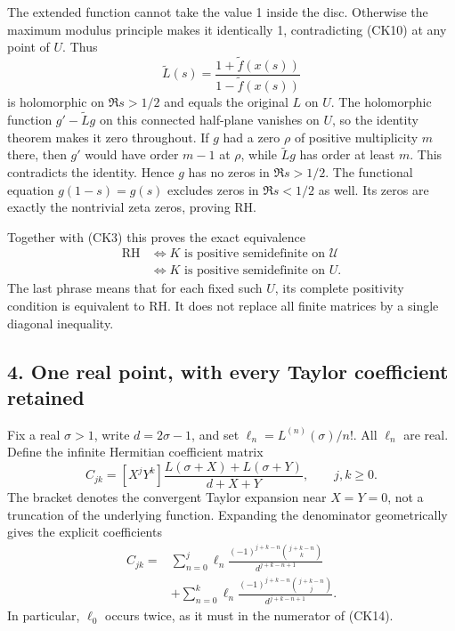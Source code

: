 \documentclass[
  10pt,
  a4paper,
]{article}
\begin{document}
The extended function cannot take the value 1 inside the disc. Otherwise
the maximum modulus principle makes it identically 1, contradicting
(CK10) at any point of \(U\). Thus \[
\widetilde L(s)=\frac{1+\widetilde f(x(s))}{1-\widetilde f(x(s))}
\tag{CK12}
\] is holomorphic on \(\Re s>1/2\) and equals the original \(L\) on
\(U\). The holomorphic function \(g'-\widetilde Lg\) on this connected
half-plane vanishes on \(U\), so the identity theorem makes it zero
throughout. If \(g\) had a zero \(\rho\) of positive multiplicity \(m\)
there, then \(g'\) would have order \(m-1\) at \(\rho\), while
\(\widetilde Lg\) has order at least \(m\). This contradicts the
identity. Hence \(g\) has no zeros in \(\Re s>1/2\). The functional
equation \(g(1-s)=g(s)\) excludes zeros in \(\Re s<1/2\) as well. Its
zeros are exactly the nontrivial zeta zeros, proving RH.

Together with (CK3) this proves the exact equivalence \[
\boxed{\begin{aligned}
\mathrm{RH}&\Longleftrightarrow K\text{ is positive semidefinite on }\mathcal U\\
&\Longleftrightarrow K\text{ is positive semidefinite on }U.
\end{aligned}}
\tag{CK13}
\] The last phrase means that for each fixed such \(U\), its complete
positivity condition is equivalent to RH. It does not replace all finite
matrices by a single diagonal inequality.

\subsection{4. One real point, with every Taylor coefficient
retained}\label{one-real-point-with-every-taylor-coefficient-retained}

Fix a real \(\sigma>1\), write \(d=2\sigma-1\), and set
\(\ell_n=L^{(n)}(\sigma)/n!\). All \(\ell_n\) are real. Define the
infinite Hermitian coefficient matrix \[
C_{jk}=[X^jY^k]\frac{L(\sigma+X)+L(\sigma+Y)}{d+X+Y},\qquad j,k\ge0.
\tag{CK14}
\] The bracket denotes the convergent Taylor expansion near \(X=Y=0\),
not a truncation of the underlying function. Expanding the denominator
geometrically gives the explicit coefficients \[
\begin{split}
C_{jk}={}&\sum_{n=0}^j
\ell_n\frac{(-1)^{j+k-n}\binom{j+k-n}{k}}{d^{j+k-n+1}}\\
&+\sum_{n=0}^k
\ell_n\frac{(-1)^{j+k-n}\binom{j+k-n}{j}}{d^{j+k-n+1}}.
\end{split}\tag{CK15}
\] In particular, \(\ell_0\) occurs twice, as it must in the numerator
of (CK14).
\end{document}
